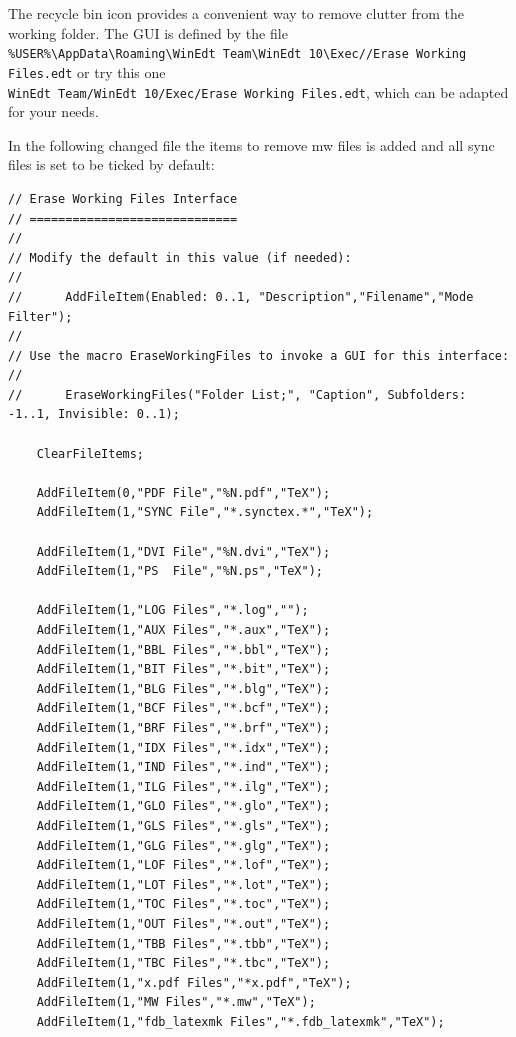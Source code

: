 The recycle bin icon provides a convenient way to remove clutter from the working folder.
The GUI is defined by the file \\
\lstinline{%USER%\AppData\Roaming\WinEdt Team\WinEdt 10\Exec//Erase Working Files.edt}
or try this one\\
\lstinline{WinEdt Team/WinEdt 10/Exec/Erase Working Files.edt}, which can be adapted for your needs.

In the following changed file the items to remove mw files is added and all sync files is set to be ticked by default:

\begin{lstlisting}
// Erase Working Files Interface
// =============================
//
// Modify the default in this value (if needed):
//
//      AddFileItem(Enabled: 0..1, "Description","Filename","Mode Filter");
//
// Use the macro EraseWorkingFiles to invoke a GUI for this interface:
//
//      EraseWorkingFiles("Folder List;", "Caption", Subfolders: -1..1, Invisible: 0..1);

    ClearFileItems;

    AddFileItem(0,"PDF File","%N.pdf","TeX");
    AddFileItem(1,"SYNC File","*.synctex.*","TeX");

    AddFileItem(1,"DVI File","%N.dvi","TeX");
    AddFileItem(1,"PS  File","%N.ps","TeX");

    AddFileItem(1,"LOG Files","*.log","");
    AddFileItem(1,"AUX Files","*.aux","TeX");
    AddFileItem(1,"BBL Files","*.bbl","TeX");
    AddFileItem(1,"BIT Files","*.bit","TeX");
    AddFileItem(1,"BLG Files","*.blg","TeX");
    AddFileItem(1,"BCF Files","*.bcf","TeX");
    AddFileItem(1,"BRF Files","*.brf","TeX");
    AddFileItem(1,"IDX Files","*.idx","TeX");
    AddFileItem(1,"IND Files","*.ind","TeX");
    AddFileItem(1,"ILG Files","*.ilg","TeX");
    AddFileItem(1,"GLO Files","*.glo","TeX");
    AddFileItem(1,"GLS Files","*.gls","TeX");
    AddFileItem(1,"GLG Files","*.glg","TeX");
    AddFileItem(1,"LOF Files","*.lof","TeX");
    AddFileItem(1,"LOT Files","*.lot","TeX");
    AddFileItem(1,"TOC Files","*.toc","TeX");
    AddFileItem(1,"OUT Files","*.out","TeX");
    AddFileItem(1,"TBB Files","*.tbb","TeX");
    AddFileItem(1,"TBC Files","*.tbc","TeX");
    AddFileItem(1,"x.pdf Files","*x.pdf","TeX");
    AddFileItem(1,"MW Files","*.mw","TeX");
    AddFileItem(1,"fdb_latexmk Files","*.fdb_latexmk","TeX");


\end{lstlisting}
